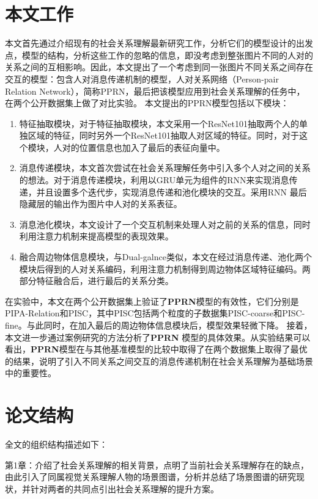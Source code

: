 \section{本文工作}

本文首先通过介绍现有的社会关系理解最新研究工作，分析它们的模型设计的出发点，模型的结构，分析这些工作的忽略的信息，即没考虑到整张图片不同的人对的关系之间的互相影响。因此，本文提出了一个考虑到同一张图片不同关系之间存在交互的模型：包含人对消息传递机制的模型，人对关系网络（Person-pair Relation Network），简称PPRN，最后把该模型应用到社会关系理解的任务中，在两个公开数据集上做了对比实验。
本文提出的PPRN模型包括以下模块：
\begin{enumerate}
    \item 特征抽取模块，对于特征抽取模块，本文采用一个ResNet101\cite{he2016deep}抽取两个人的单独区域的特征，同时另外一个ResNet101抽取人对区域的特征。同时，对于这个模块，人对的位置信息也加入了最后的表征向量中。
    \item 消息传递模块，本文首次尝试在社会关系理解任务中引入多个人对之间的关系的想法。对于消息传递模块，利用以GRU单元为组件的RNN来实现消息传递，并且设置多个迭代步，实现消息传递和池化模块的交互。采用RNN 最后隐藏层的输出作为图片中人对的关系表征。
    \item 消息池化模块，本文设计了一个交互机制来处理人对之前的关系的信息，同时利用注意力机制来提高模型的表现效果。
    \item 融合周边物体信息模块，与Dual-galnce\cite{li2017dual-glance}类似，本文在经过消息传递、池化两个模块后得到的人对关系编码，利用注意力机制得到周边物体区域特征编码。两部分特征融合后，进行最后的关系分类。
\end{enumerate}
在实验中，本文在两个公开数据集上验证了\textbf{PPRN}模型的有效性，它们分别是PIPA-Relation和PISC，其中PISC包括两个粒度的子数据集PISC-coarse和PISC-fine。与此同时，在加入最后的周边物体信息模块后，模型效果轻微下降。
接着，本文进一步通过案例研究的方法分析了\textbf{PPRN} 模型的具体效果。从实验结果可以看出，\textbf{PPRN}模型在与其他基准模型的比较中取得了在两个数据集上取得了最优的结果，说明了引入不同关系之间交互的消息传递机制在社会关系理解为基础场景中的重要性。

\section{论文结构}

全文的组织结构描述如下：

第1章：介绍了社会关系理解的相关背景，点明了当前社会关系理解存在的缺点，由此引入了同属视觉关系理解人物的场景图谱，分析并总结了场景图谱的研究现状，并针对两者的共同点引出社会关系理解的提升方案。

